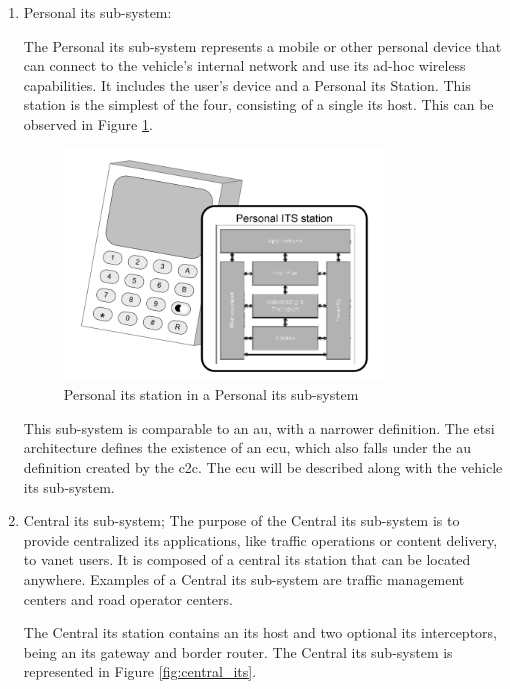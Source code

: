 \begin{enumerate}
	\item Personal \gls{its} sub-system:

The Personal \gls{its} sub-system represents a mobile or other personal device that can connect to the vehicle's internal network and use its ad-hoc wireless capabilities. It includes the user's device and a Personal \gls{its} Station. This station is the simplest of the four, consisting of a single \gls{its} host. This can be observed in Figure \ref{fig:personal_its}.

\begin{figure}[htbp]
    \centering
   	\includegraphics[width=0.8\textwidth]{Chapters/Figures/VANETs/personal_ITS.png}
   	\caption{Personal \gls{its} station in a Personal \gls{its} sub-system~\cite{etsi_intelligent_2010}}
   	\label{fig:personal_its}
\end{figure}


This sub-system is comparable to an \gls{au}, with a narrower definition. The \gls{etsi} architecture defines the existence of an \gls{ecu}, which also falls under the \gls{au} definition created by the \gls{c2c}. The \gls{ecu} will be described along with the vehicle \gls{its} sub-system.
	\item Central \gls{its} sub-system;
The purpose of the Central \gls{its} sub-system is to provide centralized \gls{its} applications, like traffic operations or content delivery, to \gls{vanet} users. It is composed of a central \gls{its} station that can be located anywhere. Examples of a Central \gls{its} sub-system are traffic management centers and road operator centers.

The Central \gls{its} station contains an \gls{its} host and two optional \gls{its} interceptors, being an \gls{its} gateway and border router. The Central \gls{its} sub-system is represented in Figure \ref{fig:central_its}.


\end{enumerate}
